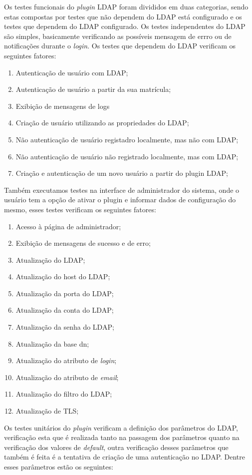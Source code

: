 Os testes funcionais do \textit{plugin} LDAP foram divididos em duas categorias, sendo estas compostas por testes que não dependem do LDAP está configurado e os testes que dependem do LDAP configurado. Os testes independentes do LDAP são simples, basicamente verificando as possíveis mensagem de errro ou de notificações durante o \textit{login}. Os testes  que dependem do LDAP verificam os seguintes fatores:
%
\begin{enumerate}
\item Autenticação de usuário com LDAP;
\item Autenticação de usuário a partir da sua matrícula;
\item Exibição de mensagens de logs
\item Criação de usuário utilizando as propriedades do LDAP;
\item Não autenticação de usuário registadro localmente, mas não com LDAP;
\item Não autenticação de usuário não registrado localmente, mas com LDAP;
\item Criação e autenticação de um novo usuário a partir do plugin LDAP;
\end{enumerate}
%
Também executamos testes na interface de administrador do sistema, onde o usuário tem a opção de ativar o plugin e informar dados de configuração do mesmo, esses testes verificam os seguintes fatores:
%
\begin{enumerate}
\item Acesso à página de administrador;
\item Exibição de mensagens de sucesso e de erro;
\item Atualização do LDAP;
\item Atualização do host do LDAP;
\item Atualização da porta do LDAP;
\item Atualização da conta do LDAP;
\item Atualização da senha do LDAP;
\item Atualização da base dn;
\item Atualização do atributo de \textit{login};
\item Atualização do atributo de \textit{email};
\item Atualização do filtro do LDAP;
\item Atualização de TLS;
\end{enumerate}

Os testes unitários do \textit{plugin} verificam a definição dos parâmetros do LDAP, verificação esta que é realizada tanto na passagem dos parâmetros quanto na verificação dos valores de \textit{default}, outra verificação desses parâmetros que também é feita é a tentativa de criação de uma autenticação no LDAP. Dentre esses parâmetros estão os seguintes:

